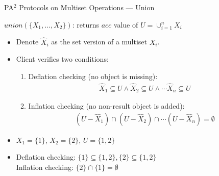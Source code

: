 \documentclass[xcolor={dvipsnames},aspectratio=169,10pt]{beamer}
\begin{document}
\begin{frame}{PA$^2$ Protocols on Multiset Operations --- Union}
  \begin{block}{$union(\{X_1, \dotsc, X_2\})$: returns $acc$ value of $U = \cup_{i=1}^n X_i$}
    \begin{itemize}
      \item Denote $\widehat{X}_i$ as the \alert{set version} of a multiset $X_i$.
      \item Client verifies two conditions:
        \begin{enumerate}
          \item \alert{Deflation checking} (no object is missing):
            \begin{align*}
              \widehat{X}_1 \subseteq U \wedge \widehat{X}_2 \subseteq U \wedge \cdots \widehat{X}_n \subseteq U
            \end{align*}
          \item \alert{Inflation checking} (no non-result object is added):
            \begin{align*}
              (U - \widehat{X}_1) \cap (U - \widehat{X}_2) \cap \cdots (U - \widehat{X}_n) = \emptyset
            \end{align*}
        \end{enumerate}
    \end{itemize}
  \end{block}
  \begin{example}
    \begin{itemize}
      \item $X_1 = \{ 1 \}$, $X_2 = \{ 2 \}$, $U = \{ 1, 2 \}$
      \item \alert{Deflation checking}: $\{1\} \subseteq \{1,2\}, \{2\} \subseteq \{1,2\}$ \\
        \alert{Inflation checking}: $\{2\} \cap \{1\} = \emptyset$
    \end{itemize}
  \end{example}
\end{frame}
\end{document}
